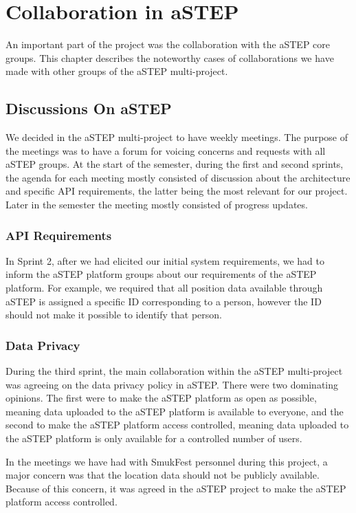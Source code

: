 \chapter{Collaboration in aSTEP}\label{ch:collab}

An important part of the project was the collaboration with the aSTEP core groups. This chapter describes the noteworthy cases of collaborations we have made with other groups of the aSTEP multi-project.

\section{Discussions On aSTEP}
We decided in the aSTEP multi-project to have weekly meetings. The purpose of the meetings was to have a forum for voicing concerns and requests with all aSTEP groups. At the start of the semester, during the first and second sprints, the agenda for each meeting mostly consisted of discussion about the architecture and specific API requirements, the latter being the most relevant for our project. Later in the semester the meeting mostly consisted of progress updates.

\subsection{API Requirements}
In Sprint 2, after we had elicited our initial system requirements, we had to inform the aSTEP platform groups about our requirements of the aSTEP platform. For example, we required that all position data available through aSTEP is assigned a specific ID corresponding to a person, however the ID should not make it possible to identify that person.

\subsection{Data Privacy}

During the third sprint, the main collaboration within the aSTEP multi-project was agreeing on the data privacy policy in aSTEP. There were two dominating opinions. The first were to make the aSTEP platform as open as possible, meaning data uploaded to the aSTEP platform is available to everyone, and the second to make the aSTEP platform access controlled, meaning data uploaded to the aSTEP platform is only available for a controlled number of users.

In the meetings we have had with SmukFest personnel during this project, a major concern was that the location data should not be publicly available. Because of this concern, it was agreed in the aSTEP project to make the aSTEP platform access controlled.


